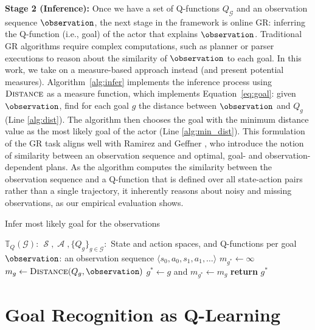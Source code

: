 \documentclass[letterpaper]{article} %
\DeclareMathOperator{\statespace}{\mathcal{S}}
\DeclareMathOperator{\actionspace}{\mathcal{A}}
\providecommand\theory{\mathbb{T}}
\providecommand\goals{\mathcal{G}}
\providecommand\goal{g}
\begin{document}
\noindent \textbf{Stage 2 (Inference):} Once we have a set of Q-functions $Q_{\goals}$ and an observation sequence $\observation$, the next stage in the framework is online GR: inferring the Q-function (i.e., goal) of the actor that explains $\observation$. 
Traditional GR algorithms require complex computations, such as planner or parser executions to reason about the similarity of $\observation$ to each goal. 
In this work, we take on a measure-based approach instead (and present potential measures). 
Algorithm~\ref{alg:infer} implements the inference process using $\textsc{Distance}$ as a measure function, which implements Equation~\ref{eq:goal}: given $\observation$, find for each goal $g$ the distance between $\observation$ and $Q_g$ (Line \ref{alg:dist}). 
The algorithm then chooses the goal with the minimum distance value as the most likely goal of the actor (Line \ref{alg:min_dist}). 
This formulation of the GR task aligns well with Ramirez and Geffner , who introduce the notion of similarity between an observation sequence and optimal, goal- and observation-dependent plans. 
As the algorithm computes the similarity between the observation sequence and a Q-function that is defined over all state-action pairs rather than a single trajectory, it inherently reasons about noisy and missing observations, as our empirical evaluation shows.


\begin{algorithm}[t]
    \caption{Infer most likely goal for the observations}
    \label{alg:infer}
\begin{algorithmic}[1]
    \small
    \Require $\theory_Q(\goals)$: $\statespace, \actionspace, \{Q_g\}_{g \in \goals}:$ State and action spaces, and Q-functions per goal
    \Require $\observation$: an observation sequence $\langle s_0, a_0, s_1, a_1, \ldots \rangle$
    \State $m_{g^*} \gets \infty$ 
    \ForAll{$\goal \in \goals$} 
        \State $m_g \gets \Call{Distance}{Q_g, \observation}$ 
        \label{alg:dist}
            \State $g^* \gets g$ and $m_{g^*} \gets m_g$
        \EndIf
    \EndFor
    \State \textbf{return} $g^*$
    \label{alg:min_dist}
\end{algorithmic}
\end{algorithm}


\section*{Goal Recognition as Q-Learning}
\label{sec:graql}
\end{document}
